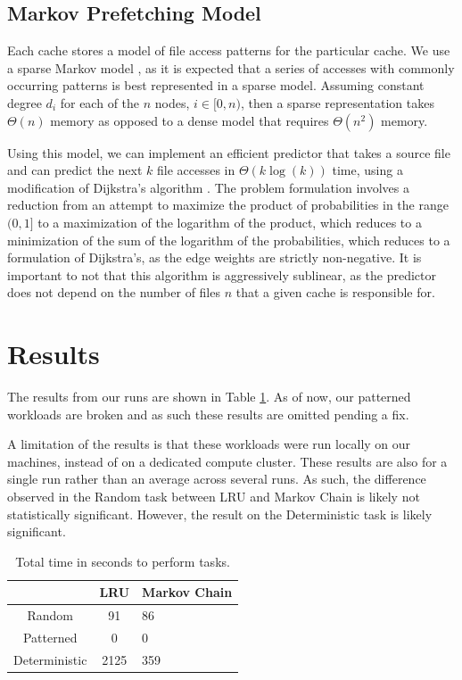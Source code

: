 \documentclass[sigconf]{acmart}
\begin{document}
\subsection{Markov Prefetching Model}
\label{sec:markovchain}
Each cache stores a model of file access patterns for the particular cache. We use a sparse Markov model \cite{xiong2016SparseMarkov}, as it is expected that a series of accesses with commonly occurring patterns is best represented in a sparse model. Assuming constant degree $d_i$ for each of the $n$ nodes, $i \in [0, n)$, then a sparse representation takes $\Theta(n)$ memory as opposed to a dense model that requires $\Theta(n^2)$ memory. 

Using this model, we can implement an efficient predictor that takes a source file and can predict the next $k$ file accesses in $\Theta(k \log(k))$ time, using a modification of Dijkstra's algorithm \cite{dijkstra1959}. The problem formulation involves a reduction from an attempt to maximize the product of probabilities in the range $(0, 1]$ to a maximization of the logarithm of the product, which reduces to a minimization of the sum of the logarithm of the probabilities, which reduces to a formulation of Dijkstra's, as the edge weights are strictly non-negative. It is important to not that this algorithm is aggressively sublinear, as the predictor does not depend on the number of files $n$ that a given cache is responsible for.



\section{Results}
\label{sec:results}
The results from our runs are shown in Table \ref{tab:freq}. As of now, our patterned workloads are broken and as such these results are omitted pending a fix.

A limitation of the results is that these workloads were run locally on our machines, instead of on a dedicated compute cluster. These results are also for a single run rather than an average across several runs. As such, the difference observed in the Random task between LRU and Markov Chain is likely not statistically significant. However, the result on the Deterministic task is likely significant.

\begin{table}[h]
  \caption{Total time in seconds to perform tasks.}
  \label{tab:freq}
  \begin{tabular}{ccl}
    \toprule
     & LRU  & Markov Chain \\
    \midrule
 Random & 91 & 86 \\
 Patterned  & 0 & 0 \\
 Deterministic  & 2125 & 359 \\
  \bottomrule
\end{tabular}
\end{table}
\end{document}
